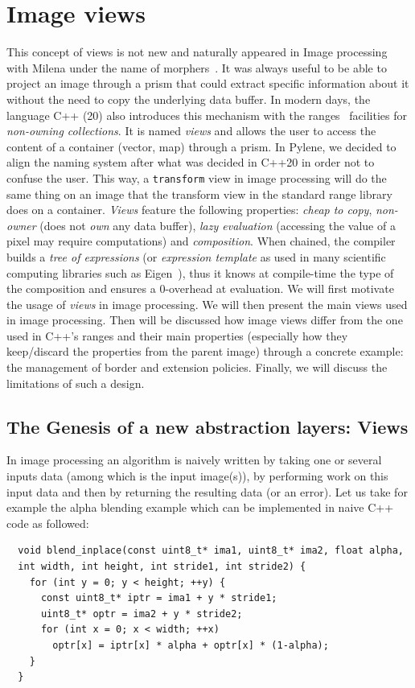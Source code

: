 \chapter{Image views}
\label{chap:image_views}

This concept of views is not new and naturally appeared in Image processing with Milena under the name of
morphers~\parencite{levillain.2009.ismm, geraud.2012.hdr}. It was always useful to be able to project an image through a
prism that could extract specific information about it without the need to copy the underlying data buffer. In modern
days, the language C++ (20) also introduces this mechanism with the ranges~\parencite{niebler.2014.ranges} facilities
for \emph{non-owning collections}. It is named \emph{views} and allows the user to access the content of a container
(vector, map) through a prism. In Pylene, we decided to align the naming system after what was decided in C++20 in order
not to confuse the user. This way, a \texttt{transform} view in image processing will do the same thing on an image that
the transform view in the standard range library does on a container. \emph{Views} feature the following properties:
\emph{cheap to copy}, \emph{non-owner} (does not \emph{own} any data buffer), \emph{lazy evaluation} (accessing the
value of a pixel may require computations) and \emph{composition}. When chained, the compiler builds a \emph{tree of
expressions} (or \emph{expression template} as used in many scientific computing libraries such as
Eigen~\cite{guennebaud.2010.eigen}), thus it knows at compile-time the type of the composition and ensures a 0-overhead
at evaluation. We will first motivate the usage of \emph{views} in image processing. We will then present the main views
used in image processing. Then will be discussed how image views differ from the one used in C++'s ranges and their main
properties (especially how they keep/discard the properties from the parent image) through a concrete example: the
management of border and extension policies. Finally, we will discuss the limitations of such a design.

\section{The Genesis of a new abstraction layers: Views}
\label{sec:genesis_of_views}

In image processing an algorithm is naively written by taking one or several inputs data (among which is the input image(s)),  by performing work on this input data and then by returning the resulting data (or an error). Let us take for example the alpha blending example which can be implemented in naive C++ code as followed:
\begin{verbatim}
  void blend_inplace(const uint8_t* ima1, uint8_t* ima2, float alpha,
  int width, int height, int stride1, int stride2) {
    for (int y = 0; y < height; ++y) {
      const uint8_t* iptr = ima1 + y * stride1;
      uint8_t* optr = ima2 + y * stride2;
      for (int x = 0; x < width; ++x)
        optr[x] = iptr[x] * alpha + optr[x] * (1-alpha);
    }
  }
\end{verbatim}

